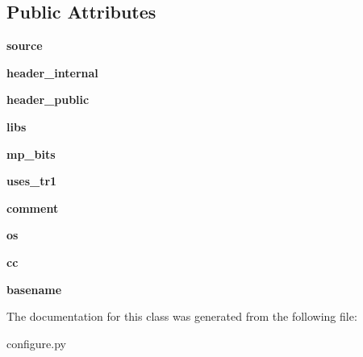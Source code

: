 \subsection*{Public Attributes}
\begin{DoxyCompactItemize}
\item 
\hypertarget{classconfigure_1_1ModuleInfo_a1f55c52a1cc22fe6a617996b31209f72}{{\bfseries source}}\label{classconfigure_1_1ModuleInfo_a1f55c52a1cc22fe6a617996b31209f72}

\item 
\hypertarget{classconfigure_1_1ModuleInfo_a7b3b7f1d719048f4bee43d965c4cf45d}{{\bfseries header\-\_\-internal}}\label{classconfigure_1_1ModuleInfo_a7b3b7f1d719048f4bee43d965c4cf45d}

\item 
\hypertarget{classconfigure_1_1ModuleInfo_a11cd8acc4bfffd2f6c53ded39ab0c801}{{\bfseries header\-\_\-public}}\label{classconfigure_1_1ModuleInfo_a11cd8acc4bfffd2f6c53ded39ab0c801}

\item 
\hypertarget{classconfigure_1_1ModuleInfo_a18259af00b297721ce3b3a104e1989e5}{{\bfseries libs}}\label{classconfigure_1_1ModuleInfo_a18259af00b297721ce3b3a104e1989e5}

\item 
\hypertarget{classconfigure_1_1ModuleInfo_a28faec95b2c0d831b345c10bbe793dc3}{{\bfseries mp\-\_\-bits}}\label{classconfigure_1_1ModuleInfo_a28faec95b2c0d831b345c10bbe793dc3}

\item 
\hypertarget{classconfigure_1_1ModuleInfo_a4521f201b1e795944d743f933a3d1767}{{\bfseries uses\-\_\-tr1}}\label{classconfigure_1_1ModuleInfo_a4521f201b1e795944d743f933a3d1767}

\item 
\hypertarget{classconfigure_1_1ModuleInfo_ad5517bd4f7215d73ecf168b1fb3fc511}{{\bfseries comment}}\label{classconfigure_1_1ModuleInfo_ad5517bd4f7215d73ecf168b1fb3fc511}

\item 
\hypertarget{classconfigure_1_1ModuleInfo_a66ffcf083ee908821fbeeaeed527fd87}{{\bfseries os}}\label{classconfigure_1_1ModuleInfo_a66ffcf083ee908821fbeeaeed527fd87}

\item 
\hypertarget{classconfigure_1_1ModuleInfo_a8b9afbde52a59362e5c26706b6871d87}{{\bfseries cc}}\label{classconfigure_1_1ModuleInfo_a8b9afbde52a59362e5c26706b6871d87}

\item 
\hypertarget{classconfigure_1_1ModuleInfo_a4d5abb42cdfbdab59e861a87b156996c}{{\bfseries basename}}\label{classconfigure_1_1ModuleInfo_a4d5abb42cdfbdab59e861a87b156996c}

\end{DoxyCompactItemize}


The documentation for this class was generated from the following file\-:\begin{DoxyCompactItemize}
\item 
configure.\-py\end{DoxyCompactItemize}
